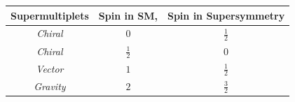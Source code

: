 \begin{center}
\centering
\begin{tabular}{|c |c|c|}
\hline
\bfseries{Supermultiplets} & \bfseries {Spin in SM}, & \bfseries{Spin in Supersymmetry}\\
\hline \hline

\textit{Chiral} & $0$ & $\frac{1}{2}$ \\ 
\textit{Chiral} &$\frac{1}{2}$ & $0$ \\   \hline
\textit{Vector} & $1$ & $\frac{1}{2} $ \\ \hline
\textit{Gravity} & $2$ & $\frac{3}{2} $ \\
\hline \hline
\end{tabular}
\label{tab:SUSYM} 
\end{center}

